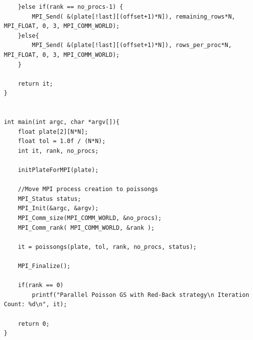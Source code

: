 \documentclass{article}
\begin{document}
\begin{appendices}
\begin{framed}
\begin{verbatim}
    }else if(rank == no_procs-1) {
        MPI_Send( &(plate[!last][(offset+1)*N]), remaining_rows*N, MPI_FLOAT, 0, 3, MPI_COMM_WORLD);
    }else{
        MPI_Send( &(plate[!last][(offset+1)*N]), rows_per_proc*N, MPI_FLOAT, 0, 3, MPI_COMM_WORLD);
    }
    
    return it;
}


int main(int argc, char *argv[]){
    float plate[2][N*N];
    float tol = 1.0f / (N*N);
    int it, rank, no_procs;

    initPlateForMPI(plate);

    //Move MPI process creation to poissongs
    MPI_Status status;
    MPI_Init(&argc, &argv);
    MPI_Comm_size(MPI_COMM_WORLD, &no_procs);
    MPI_Comm_rank( MPI_COMM_WORLD, &rank );

    it = poissongs(plate, tol, rank, no_procs, status);

    MPI_Finalize();

    if(rank == 0)
        printf("Parallel Poisson GS with Red-Back strategy\n Iteration Count: %d\n", it);

    return 0;
}
\end{verbatim}
\end{framed}

\end{appendices}
\end{document}
